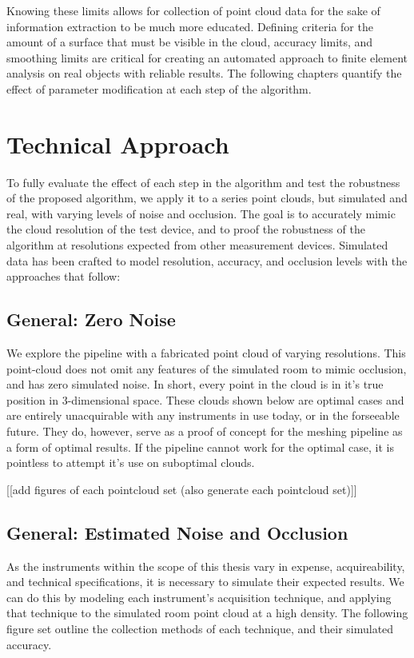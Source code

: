 \documentclass[12pt]{drexelthesis}
\let\Oldsection\section
\renewcommand{\section}{\FloatBarrier\Oldsection}
\let\Oldsubsection\subsection
\renewcommand{\subsection}{\FloatBarrier\Oldsubsection}
\begin{document}
Knowing these limits allows for collection of point cloud data for the sake of information extraction to be much more educated. Defining criteria for the amount of a surface that must be visible in the cloud, accuracy limits, and smoothing limits are critical for creating an automated approach to finite element analysis on real objects with reliable results. The following chapters quantify the effect of parameter modification at each step of the algorithm.

\section{Technical Approach}
To fully evaluate the effect of each step in the algorithm and test the robustness of the proposed algorithm, we apply it to a series point clouds, but simulated and real, with varying levels of noise and occlusion. The goal is to accurately mimic the cloud resolution of the test device, and to proof the robustness of the algorithm at resolutions expected from other measurement devices. Simulated data has been crafted to model resolution, accuracy, and occlusion levels with the approaches that follow:

\subsection{General: Zero Noise}
We explore the pipeline with a fabricated point cloud of varying resolutions. This point-cloud does not omit any features of the simulated room to mimic occlusion, and has zero simulated noise. In short, every point in the cloud is in it's true position in 3-dimensional space. These clouds shown below are optimal cases and are entirely unacquirable with any instruments in use today, or in the forseeable future. They do, however, serve as a proof of concept for the meshing pipeline as a form of optimal results. If the pipeline cannot work for the optimal case, it is pointless to attempt it's use on suboptimal clouds.

[[add figures of each pointcloud set (also generate each pointcloud set)]]

\subsection{General: Estimated Noise and Occlusion}
As the instruments within the scope of this thesis vary in expense, acquireability, and technical specifications, it is necessary to simulate their expected results. We can do this by modeling each instrument's acquisition technique, and applying that technique to the simulated room point cloud at a high density. The following figure set outline the collection methods of each technique, and their simulated accuracy.
\end{document}
